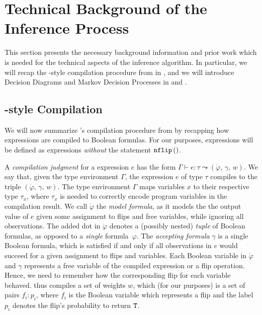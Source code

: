 
\section{Technical Background of the Inference Process}\label{sec:background}
 This section presents the necessary background information and prior work which is needed for the technical aspects of the \NDICE inference algorithm.
 In particular, we will recap the \DICE-style compilation procedure from \citet{holtzen2020scaling} in , and we will introduce Decision Diagrams and Markov Decision Processes in  and .


\subsection{\DICE-style Compilation}\label{sec:prelims_Dice}

We will now summarize \DICE's compilation procedure from \citet{holtzen2020scaling} by recapping how \DICE expressions are compiled to Boolean formulas.
For our purposes, \DICE expressions will be defined as \NDICE expressions \textit{without} the statement $\texttt{nflip}\left(\right) $.

A \emph{compilation judgment} for a \DICE expression $e$ has the form $\Gamma \vdash e \colon \tau \leadsto (\dot{\varphi},\, \gamma,\, w)$. 
We say that, given the type environment $\Gamma$, the expression $e$ of type $\tau$ compiles to the triple $(\dot{\varphi},\, \gamma,\, w)$.
The type environment $\Gamma$ maps variables $x$ to their respective type $\tau_x$, where $\tau_x$ is needed to correctly encode program variables in the compilation result.
We call $\dot{\varphi}$ the \textit{model formula}, as it models the the output value of $e$ given some assignment to flips and free variables, while ignoring all observations.
The added dot in $\dot{\varphi}$ denotes a (possibly nested) \emph{tuple} of Boolean formulas, as opposed to a \emph{single} formula~$\varphi$.
The \textit{accepting formula} $\gamma$ is a single Boolean formula, which is satisfied if and only if all observations in $e$ would succeed for a given assignment to flips and variables.
Each Boolean variable in $\dot{\varphi}$ and $\gamma$ represents a free variable of the compiled expression or a flip operation. 
Hence, we need to remember how the corresponding flip for each variable behaved.
\DICE thus compiles a set of weights $w$, which (for our purposes) is a set of pairs $f_i\colon p_i$, where $f_i$ is the Boolean variable which represents a flip and the label $p_i$ denotes the flip's probability to return $\texttt{T}$.

